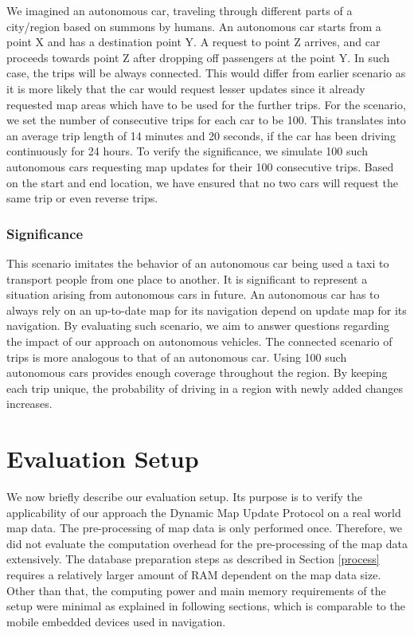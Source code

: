 We imagined an autonomous car, traveling through different parts of a city/region based on summons by humans. An autonomous car starts from a point X and has a destination point Y. A request to point Z arrives, and car proceeds towards point Z after dropping off passengers at the point Y. In such case, the trips will be always connected. This would differ from earlier scenario as it is more likely that the car would request lesser updates since it already requested map areas which have to be used for the further trips. For the scenario, we set the number of consecutive trips for each car to be 100. This translates into an average trip length of 14 minutes and 20 seconds, if the car has been driving continuously for 24 hours. To verify the significance, we simulate 100 such autonomous cars requesting map updates for their 100 consecutive trips. Based on the start and end location, we have ensured that no two cars will request the same trip or even reverse trips. 

\subsubsection{Significance}
This scenario imitates the behavior of an autonomous car being used a taxi to transport people from one place to another. It is significant to represent a situation arising from autonomous cars in future. An autonomous car has to always rely on an up-to-date map for its navigation depend on update map for its navigation. By evaluating such scenario, we aim to answer questions regarding the impact of our approach on autonomous vehicles. The connected scenario of trips is more analogous to that of an autonomous car. Using 100 such autonomous cars provides enough coverage throughout the region. By keeping each trip unique, the probability of driving in a region with newly added changes increases. 




 
\section{Evaluation Setup}\label{setup}
We now briefly describe our evaluation setup. Its purpose is to verify the applicability of our approach the Dynamic Map Update Protocol on a real world map data. The pre-processing of map data is only performed once. Therefore, we did not evaluate the computation overhead for the pre-processing of the map data extensively. The database preparation steps as described in Section \ref{process} requires a relatively larger amount of RAM dependent on the map data size. Other than that, the computing power and main memory requirements of the setup were minimal as explained in following sections, which is comparable to the mobile embedded devices used in navigation. 
